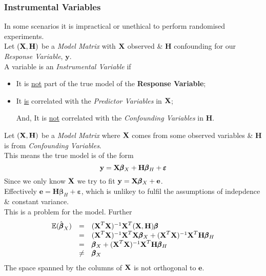 \documentclass[11pt,a4paper]{article}
\begin{document}
\subsubsection{Instrumental Variables}

In some scenarios it is impractical or unethical to perform randomised experiments.\\

Let $(\textbf{X},\textbf{H})$ be a \textit{Model Matrix} with $\textbf{X}$ observed \& $\textbf{H}$ confounding for our \textit{Response Variable}, $\textbf{y}$.\\
A variable is an \textit{Instrumental Variable} if
\begin{itemize}
	\item It is \underline{not} part of the true model of the \textbf{Response Variable};
	\item It \underline{is} correlated with the \textit{Predictor Variables} in $\textbf{X}$;
	\item[And,] It is \underline{not} correlated with the \textit{Confounding Variables} in $\textbf{H}$.
\end{itemize}


Let $(\textbf{X},\textbf{H})$ be a \textit{Model Matrix} where $\textbf{X}$ comes from some observed variables \& $\textbf{H}$ is from \textit{Confounding Variables}.\\
This means the true model is of the form
$$\textbf{y}=\textbf{X}\pmb\beta_X+\textbf{H}\pmb\beta_H+\pmb\varepsilon$$
Since we only know $\textbf{X}$ we try to fit $\textbf{y}=\textbf{X}\pmb\beta_X+\textbf{e}$.\\
Effectively $\textbf{e}=\textbf{H}\pmb\beta_H+\pmb\varepsilon$, which is unlikey to fulfil the assumptions of indepdence \& constant variance.\\
This is a problem for the model. Further
\[\begin{array}{rcl}
\mathbb{E}(\hat{\pmb\beta}_X)&=&(\textbf{X}^T\textbf{X})^{-1}\textbf{X}^T(\textbf{X},\textbf{H})\pmb\beta\\
&=&(\textbf{X}^T\textbf{X})^{-1}\textbf{X}^T\textbf{X}\pmb\beta_X+(\textbf{X}^T\textbf{X})^{-1}\textbf{X}^T\textbf{H}\pmb\beta_H\\
&=&\pmb\beta_X+(\textbf{X}^T\textbf{X})^{-1}\textbf{X}^T\textbf{H}\pmb\beta_H\\
&\neq&\pmb\beta_X
\end{array}\]
\nb The space spanned by the columns of $\textbf{X}$ is not orthogonal to $\textbf{e}$.\\
\end{document}
